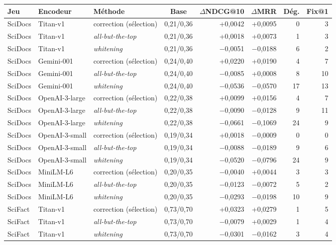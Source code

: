 \documentclass[a4paper,10pt]{article}
\begin{document}
\begin{table}[p]
\centering
\footnotesize
\begin{tabular}{lllcrrrr}
\toprule
Jeu & Encodeur & Méthode & Base & $\Delta$NDCG@10 & $\Delta$MRR & Dég. & Fix@1 \\
\midrule
SciDocs & Titan-v1 & correction (sélection) & 0,21/0,36 & +0,0042 & +0,0095 & 0 & 3 \\
SciDocs & Titan-v1 & \textit{all-but-the-top} & 0,21/0,36 & +0,0018 & +0,0073 & 1 & 3 \\
SciDocs & Titan-v1 & \textit{whitening} & 0,21/0,36 & $-$0,0051 & $-$0,0188 & 6 & 2 \\
SciDocs & Gemini-001 & correction (sélection) & 0,24/0,40 & +0,0220 & +0,0190 & 4 & 7 \\
SciDocs & Gemini-001 & \textit{all-but-the-top} & 0,24/0,40 & $-$0,0085 & +0,0008 & 8 & 10 \\
SciDocs & Gemini-001 & \textit{whitening} & 0,24/0,40 & $-$0,0536 & $-$0,0570 & 17 & 13 \\
SciDocs & OpenAI-3-large & correction (sélection) & 0,22/0,38 & +0,0099 & +0,0156 & 4 & 7 \\
SciDocs & OpenAI-3-large & \textit{all-but-the-top} & 0,22/0,38 & $-$0,0090 & $-$0,0128 & 9 & 11 \\
SciDocs & OpenAI-3-large & \textit{whitening} & 0,22/0,38 & $-$0,0661 & $-$0,1069 & 24 & 9 \\
SciDocs & OpenAI-3-small & correction (sélection) & 0,19/0,34 & +0,0018 & $-$0,0009 & 0 & 0 \\
SciDocs & OpenAI-3-small & \textit{all-but-the-top} & 0,19/0,34 & $-$0,0088 & $-$0,0189 & 9 & 6 \\
SciDocs & OpenAI-3-small & \textit{whitening} & 0,19/0,34 & $-$0,0520 & $-$0,0796 & 24 & 9 \\
SciDocs & MiniLM-L6 & correction (sélection) & 0,20/0,35 & $-$0,0040 & +0,0044 & 3 & 3 \\
SciDocs & MiniLM-L6 & \textit{all-but-the-top} & 0,20/0,35 & $-$0,0123 & $-$0,0072 & 5 & 2 \\
SciDocs & MiniLM-L6 & \textit{whitening} & 0,20/0,35 & $-$0,0293 & $-$0,0198 & 10 & 9 \\
\midrule
SciFact & Titan-v1 & correction (sélection) & 0,73/0,70 & +0,0323 & +0,0279 & 1 & 5 \\
SciFact & Titan-v1 & \textit{all-but-the-top} & 0,73/0,70 & $-$0,0079 & +0,0029 & 1 & 4 \\
SciFact & Titan-v1 & \textit{whitening} & 0,73/0,70 & $-$0,0301 & $-$0,0162 & 3 & 4 \\

\end{tabular}
\end{table}
\end{document}
